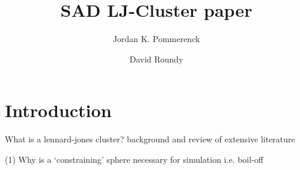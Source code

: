 \documentclass[letterpaper,twocolumn,amsmath,amssymb,pre,aps,10pt]{revtex4-1}
\begin{document}
\title{SAD LJ-Cluster paper
}

\author{Jordan K. Pommerenck} \author{David Roundy}

\begin{abstract}
\end{abstract}

\maketitle

\section{Introduction}
%
%

What is a lennard-jones cluster? background and review of extensive literature

(1) Why is a `constraining' sphere necessary for simulation i.e. boil-off
\end{document}
